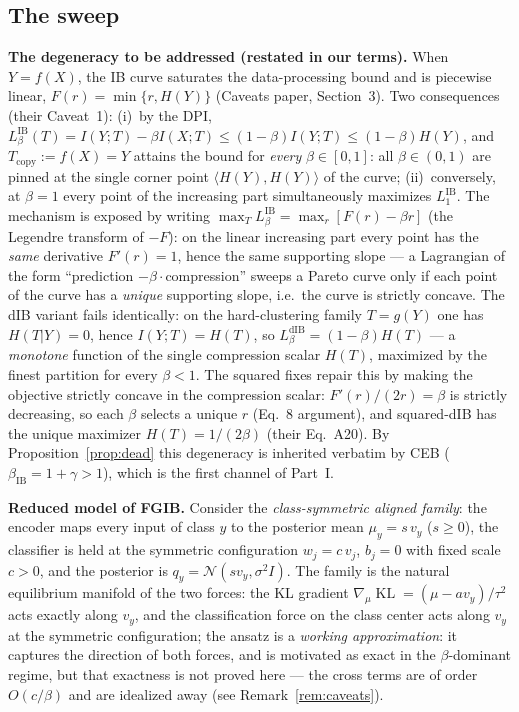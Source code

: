 \subsection{The sweep}

\textbf{The degeneracy to be addressed (restated in our terms).}
When $Y = f(X)$, the IB curve saturates the data-processing bound and is piecewise
linear, $F(r) = \min\{r, H(Y)\}$ (Caveats paper, Section~3). Two consequences (their
Caveat~1): (i)~by the DPI, $L^{\mathrm{IB}}_\beta(T) = I(Y;T) - \beta I(X;T)
\le (1-\beta)I(Y;T) \le (1-\beta)H(Y)$, and $T_{\mathrm{copy}} := f(X) = Y$ attains the
bound for \emph{every} $\beta \in [0,1]$: all $\beta \in (0,1)$ are pinned at the single
corner point $\langle H(Y), H(Y)\rangle$ of the curve; (ii)~conversely, at $\beta = 1$
every point of the increasing part simultaneously maximizes $L^{\mathrm{IB}}_1$. The
mechanism is exposed by writing $\max_T L^{\mathrm{IB}}_\beta = \max_r [F(r) - \beta r]$
(the Legendre transform of $-F$): on the linear increasing part every point has the
\emph{same} derivative $F'(r) = 1$, hence the same supporting slope --- a Lagrangian of
the form ``prediction $-\beta\cdot{}$compression'' sweeps a Pareto curve only if each
point of the curve has a \emph{unique} supporting slope, i.e.\ the curve is strictly
concave. The dIB variant fails identically: on the hard-clustering family $T = g(Y)$ one
has $H(T|Y) = 0$, hence $I(Y;T) = H(T)$, so $L^{\mathrm{dIB}}_\beta = (1-\beta)H(T)$
--- a \emph{monotone} function of the single compression scalar $H(T)$, maximized by the
finest partition for every $\beta < 1$. The squared fixes repair this by making the
objective strictly concave in the compression scalar: $F'(r)/(2r) = \beta$ is strictly
decreasing, so each $\beta$ selects a unique $r$ (Eq.~8 argument), and squared-dIB has
the unique maximizer $H(T) = 1/(2\beta)$ (their Eq.~A20). By Proposition~\ref{prop:dead}
this degeneracy is inherited verbatim by CEB ($\beta_{\mathrm{IB}} = 1+\gamma > 1$),
which is the first channel of Part~I.

\textbf{Reduced model of FGIB.}
Consider the \emph{class-symmetric aligned family}: the encoder maps every input of
class $y$ to the posterior mean $\mu_y = s\,v_y$ ($s \ge 0$), the classifier is held at
the symmetric configuration $w_j = c\,v_j$, $b_j = 0$ with fixed scale $c > 0$, and the
posterior is $q_y = \mathcal{N}(s v_y, \sigma^2 I)$. The family is the natural
equilibrium manifold of the two forces: the KL gradient
$\nabla_\mu \operatorname{KL} = (\mu - a v_y)/\tau^2$ acts exactly along $v_y$, and the
classification force on the class center acts along $v_y$ at the symmetric
configuration; the ansatz is a \emph{working approximation}: it captures the direction
of both forces, and is motivated as exact in the $\beta$-dominant regime, but that
exactness is not proved here --- the cross terms are of order $O(c/\beta)$ and are
idealized away (see Remark~\ref{rem:caveats}).

